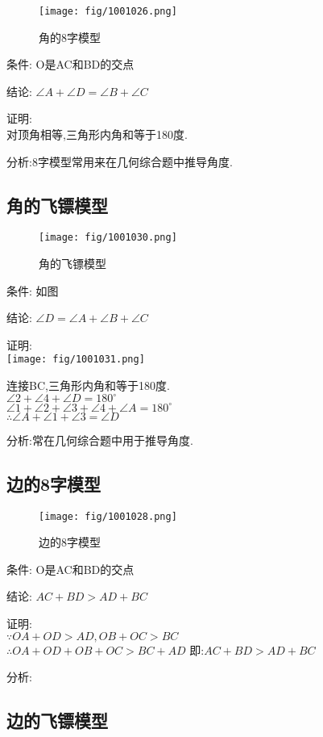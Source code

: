 \documentclass[cn,blue,10pt]{elegantbook}
\begin{document}
\begin{figure}[h]
    \centering
    \texttt{[image: fig/1001026.png]}
    \caption{角的8字模型}%
    \label{fig:倒数型相似}
\end{figure}
条件: O是AC和BD的交点 

结论: \(\angle A + \angle D = \angle B + \angle C\) 

证明:\\
对顶角相等,三角形内角和等于180度.

分析:8字模型常用来在几何综合题中推导角度. 
\subsection{角的飞镖模型}%
\label{sub:角的飞镖模型}

\begin{figure}[h]
    \centering
    \texttt{[image: fig/1001030.png]}
    \caption{角的飞镖模型}%
    \label{fig:倒数型相似}
\end{figure}
条件: 如图 

结论: \(\angle D=\angle A+\angle B+\angle C\) 

证明:\\
\texttt{[image: fig/1001031.png]}

连接BC,三角形内角和等于180度.\\
\(\angle 2+\angle 4+\angle D=180^\circ\)\\
\(\angle 1+\angle 2+\angle 3+\angle 4+\angle A=180^\circ\)\\
\(\therefore \angle A+\angle 1+\angle 3=\angle D\)

分析:常在几何综合题中用于推导角度.
\subsection{边的8字模型}%
\label{sub:边的8字模型}

\begin{figure}[h]
    \centering
    \texttt{[image: fig/1001028.png]}
    \caption{边的8字模型}%
    \label{fig:倒数型相似}
\end{figure}
条件: O是AC和BD的交点 

结论: \(AC+BD>AD+BC\) 

证明:\\
\(\because OA+OD>AD, OB+OC>BC\)\\
\(\therefore OA+OD+OB+OC>BC+AD\)
即:\(AC+BD>AD+BC\)

分析: 
\subsection{边的飞镖模型}%
\label{sub:边的飞镖模型}
\end{document}
